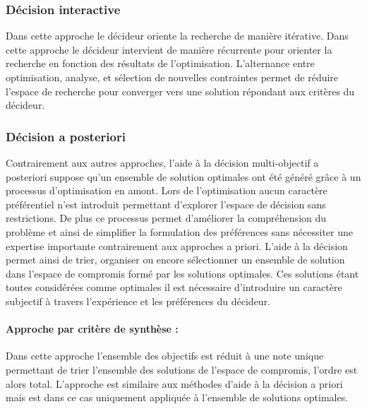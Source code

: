\subsubsection{Décision interactive} %
\label{ssub:decision_interactive}
Dans cette approche le décideur oriente la recherche de manière itérative. Dans cette
approche le décideur intervient de manière récurrente pour orienter la recherche
en fonction des résultats de l’optimisation. L’alternance entre optimisation,
analyse, et sélection de nouvelles contraintes permet de réduire l’espace de
recherche pour converger vers une solution répondant aux critères du décideur.



\subsubsection{Décision a posteriori} %
\label{ssub:decision_a_posteriori}
Contrairement aux autres approches, l’aide à la décision multi-objectif a posteriori
suppose qu’un ensemble de solution optimales ont été généré grâce à un processus
d’optimisation en amont. Lors de l’optimisation aucun caractère préférentiel
n’est introduit permettant d’explorer l’espace de décision sans restrictions.
De plus ce processus permet d’améliorer la compréhension du problème et ainsi
de simplifier la formulation des préférences sans nécessiter une expertise importante
contrairement aux approches a priori.
L’aide à la décision permet ainsi de trier, organiser ou encore sélectionner un
ensemble de solution dans l’espace de compromis formé par les solutions optimales.
Ces solutions étant toutes considérées comme optimales il est nécessaire d’introduire
un caractère subjectif à travers l’expérience et les préférences du décideur.



\paragraph{Approche par critère de synthèse :} %
\label{par:approche_par_critère_de_synthèse}
Dans cette approche l’ensemble des objectifs est réduit à une note unique permettant
de trier l’ensemble des solutions de l’espace de compromis, l’ordre est alors total.
L’approche est similaire aux méthodes d’aide à la décision a priori mais est dans
ce cas uniquement appliquée à l’ensemble de solutions optimales.

